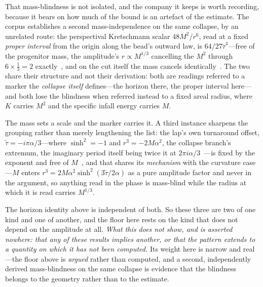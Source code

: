 \documentclass[11pt,a4paper]{article}
\theoremstyle{plain}
\theoremstyle{definition}
\theoremstyle{remark}
\begin{document}
That mass-blindness is not isolated, and the company it keeps is worth recording, because it bears on how
much of the bound is an artefact of the estimate. The corpus establishes a second mass-independence on the
same collapse, by an unrelated route: the perspectival Kretschmann scalar $48M^{2}/r^{6}$, read at a fixed
\emph{proper interval} from the origin along the bead's outward law, is $64/27\tilde\tau^{4}$---free of the
progenitor mass, the amplitude's $r\propto M^{1/3}$ cancelling the $M^{2}$ through $6\times\tfrac13=2$
exactly~\cite{JanzenCircle,JanzenCRframework}, and on the cut itself the mass cancels
identically~\cite{JanzenBoundary}. The two share their structure and not their derivation: both are
readings referred to a marker the \emph{collapse itself} defines---the horizon there, the proper interval
here---and both lose the blindness when referred instead to a fixed areal radius, where $K$ carries $M^{2}$
and the specific infall energy carries $M$. 

The mass sets a scale and the marker carries it. A third instance sharpens the grouping rather than merely lengthening the list: the lap's own turnaround offset, $\tilde\tau=-i\pi\alpha/3$---where $\sinh^{2}=-1$ and $r^{3}=-2M\alpha^{2}$, the collapse branch's extremum, the imaginary period itself being twice it at $2\pi i\alpha/3$~\cite{JanzenSlicing}---is fixed by the exponent and free of $M$~\cite{JanzenCRframework}, and that shares its \emph{mechanism} with the curvature case---$M$ enters $r^{3}=2M\alpha^{2}\sinh^{2}(3\tilde\tau/2\alpha)$ as a pure amplitude factor and never in the argument, so anything read in the phase is mass-blind while the radius at which it is read carries $M^{1/3}$. 

The horizon identity above is independent of both. So these three are two of one kind and one of another, and the floor here rests on the kind that does not depend on the amplitude at all. \emph{What this does not show, and is asserted nowhere: that any of these results implies
another, or that the pattern extends to a quantity on which it has not been computed.} Its weight here is narrow and real---the floor
above is \emph{argued} rather than computed, and a second, independently derived mass-blindness on the same
collapse is evidence that the blindness belongs to the geometry rather than to the estimate.
\end{document}
